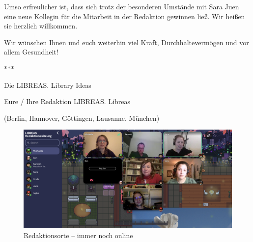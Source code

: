 \documentclass[a4paper,
fontsize=11pt,
oneside,
numbers=noperiodatend,
parskip=half-,
bibliography=totoc,
final
]{scrartcl}
\begin{document}
Umso erfreulicher ist, dass sich trotz der besonderen Umstände mit Sara
Juen eine neue Kollegin für die Mitarbeit in der Redaktion gewinnen
ließ. Wir heißen sie herzlich willkommen.

Wir wünschen Ihnen und euch weiterhin viel Kraft, Durchhaltevermögen und
vor allem Gesundheit!

***

Die LIBREAS. Library Ideas

Eure / Ihre Redaktion LIBREAS. Libreas

(Berlin, Hannover, Göttingen, Lausanne, München)

\begin{figure}[t]
\centering
\includegraphics[width=.9\textwidth]{img/img2}
\caption{Redaktionsorte -- immer noch online}
\end{figure}
\end{document}
